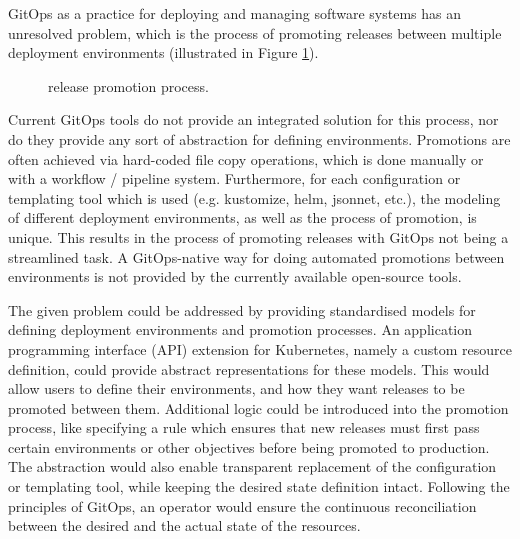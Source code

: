 GitOps as a practice for deploying and managing software systems has an unresolved problem, which is
the process of promoting releases between multiple deployment environments (illustrated in Figure \ref{fig:releasePromotionProcess}).

\begin{figure}[h]
	\centering
	\caption{release promotion process.
	}
	\label{fig:releasePromotionProcess}	
\end{figure}

Current GitOps tools do not provide an integrated solution for this process,
nor do they provide any sort of abstraction for defining environments.
Promotions are often achieved via hard-coded file copy operations,
which is done manually or with a workflow / pipeline system.
Furthermore, for each configuration or templating tool which is used
(e.g. kustomize, helm, jsonnet, etc.),
the modeling of different deployment environments, as well as the
process of promotion, is unique.
This results in the process of promoting releases with GitOps
not being a streamlined task.
A GitOps-native way for doing automated promotions between environments is
not provided by the currently available open-source tools.


%
The given problem could be addressed by
providing standardised models 
for defining deployment environments and promotion processes.
%
An application programming interface (API) extension for Kubernetes,
namely a custom resource definition,
could provide abstract representations for these models.
%
This would allow users to define
their environments,
and how they want releases to be promoted between them.
%
Additional logic could be introduced into the promotion process,
like specifying a rule which ensures that new releases must first pass
certain environments or other objectives before being promoted to production.
%
The abstraction would also enable transparent replacement of the
configuration or templating tool,
while keeping the desired state definition intact.
%
Following the principles of GitOps,
an operator would ensure the continuous reconciliation
between the desired and the actual state of the resources.

